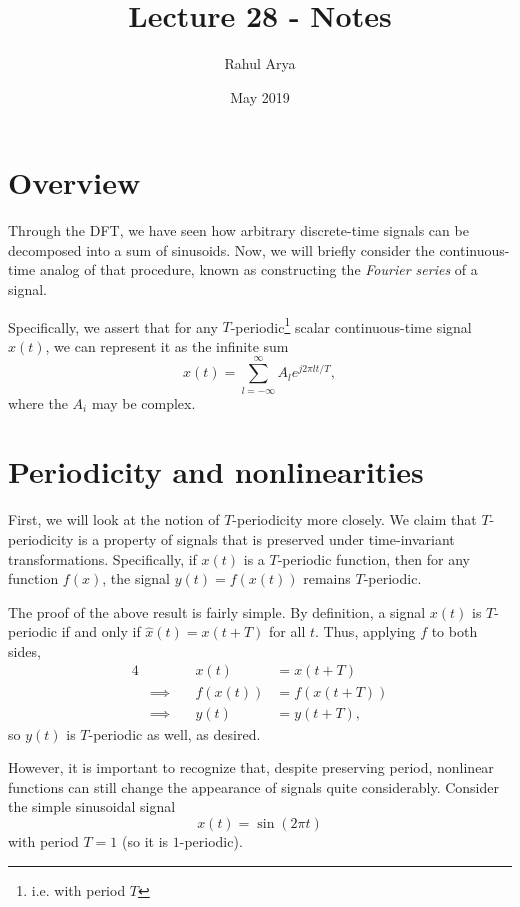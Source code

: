\documentclass[letterpaper]{article}
\title{Lecture 28 - Notes}
\author{Rahul Arya}
\date{May 2019}
\theoremstyle{remark}
\newcommand{\eqn}[1]{\begin{alignat*}{4}#1\end{alignat*}}
\newcommand*{\thus}{&\implies\quad&}
\begin{document}
\maketitle

\section{Overview}
Through the DFT, we have seen how arbitrary discrete-time signals can be decomposed into a sum of sinusoids. Now, we will briefly consider the continuous-time analog of that procedure, known as constructing the \emph{Fourier series} of a signal.

Specifically, we assert that for any $T$-periodic\footnote{i.e. with period $T$} scalar continuous-time signal $x(t)$, we can represent it as the infinite sum
\[
    x(t) = \sum_{l=-\infty}^\infty A_l e^{j 2 \pi l t / T},
\]
where the $A_i$ may be complex.

\section{Periodicity and nonlinearities}
First, we will look at the notion of $T$-periodicity more closely. We claim that $T$-periodicity is a property of signals that is preserved under time-invariant transformations. Specifically, if $x(t)$ is a $T$-periodic function, then for any function $f(x)$, the signal $y(t) = f(x(t))$ remains $T$-periodic.

The proof of the above result is fairly simple. By definition, a signal $x(t)$ is $T$-periodic if and only if $\hat{x}(t) = x(t + T)$ for all $t$. Thus, applying $f$ to both sides,
\eqn{
    && x(t) &= x(t + T) \\
    \thus f(x(t)) &= f(x(t + T)) \\
    \thus y(t) &= y(t + T),
}
so $y(t)$ is $T$-periodic as well, as desired.

However, it is important to recognize that, despite preserving period, nonlinear functions can still change the appearance of signals quite considerably. Consider the simple sinusoidal signal
\[
    x(t) = \sin(2\pi t)
\]
with period $T = 1$ (so it is $1$-periodic).
\end{document}
